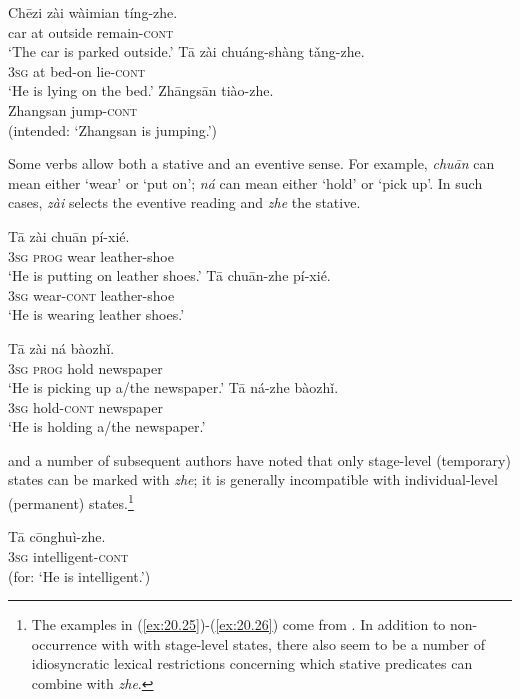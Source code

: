 \ea \label{ex:20.22}
\ea  \gll  Chēzi  zài  wàimian  tíng-zhe.\\
car  at  outside  remain-\textsc{cont} \\
\glt ‘The car is parked outside.’ 
\ex \gll  Tā  zài  chuáng-shàng  tǎng-zhe.\\
\textsc{3sg}  at  bed-on  lie-\textsc{cont}\\
\glt ‘He is lying on the bed.’  
\ex \gll  *Zhāngsān  tiào-zhe.\\
  Zhangsan  jump-\textsc{cont}\\
\glt (intended: ‘Zhangsan is jumping.’)   
\z \z


Some verbs allow both a stative and an eventive sense. For example, \textit{chuān} can mean either ‘wear’ or ‘put on’; \textit{ná} can mean either ‘hold’ or ‘pick up’. In such cases, \textit{zài} selects the eventive reading and \textit{zhe} the stative.


\ea \label{ex:20.23}
\ea  \gll  Tā  zài  chuān  pí-xié.\\
\textsc{3sg}  \textsc{prog}  wear  leather-shoe\\
\glt ‘He is putting on leather shoes.’ 
\ex \gll Tā  chuān-zhe  pí-xié.\\
\textsc{3sg}  wear-\textsc{cont}  leather-shoe\\
\glt ‘He is wearing leather shoes.’ 
\z \z

\ea \label{ex:20.24}
\ea  \gll  Tā  zài  ná  bàozhǐ.\\
\textsc{3sg}  \textsc{prog}  hold  newspaper\\
\glt ‘He is picking up a/the newspaper.’ 
\ex \gll  Tā  ná-zhe  bàozhǐ.\\
\textsc{3sg}  hold-\textsc{cont}  newspaper\\
\glt ‘He is holding a/the newspaper.’ 
\z \z


\citet{Yeh1993} and a number of subsequent authors have noted that only stage-level (temporary) states can be marked with \textit{zhe}; it is generally incompatible with individual-level (permanent) states.\footnote{The examples in (\ref{ex:20.25})-(\ref{ex:20.26}) come from \citet[274]{Smith1997}. In addition to non-occurrence with with stage-level states, there also seem to be a number of idiosyncratic lexical restrictions concerning which stative predicates can combine with \textit{zhe}.} 


\ea \label{ex:20.25}
\gll   *Tā  c\=onghuì-zhe.\\
  \textsc{3sg}  intelligent-\textsc{cont}  \\
\glt (for: ‘He is intelligent.’) 
\z


